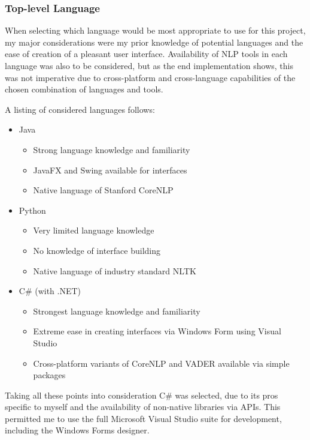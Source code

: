 \documentclass{article}
\begin{document}
{        \subsubsection{Top-level Language}
        \label{subsec:language}
        When selecting which language would be most appropriate to use for this project, my major considerations were my prior knowledge of potential languages and the ease of creation of a pleasant user interface. Availability of NLP tools in each language was also to be considered, but as the end implementation shows, this was not imperative due to cross-platform and cross-language capabilities of the chosen combination of languages and tools.

        A listing of considered languages follows:

        \begin{itemize}
            \item Java
            \begin{itemize}
                \item Strong language knowledge and familiarity
                \item JavaFX and Swing available for interfaces
                \item Native language of Stanford CoreNLP
            \end{itemize}
            \item Python
            \begin{itemize}
                \item Very limited language knowledge
                \item No knowledge of interface building
                \item Native language of industry standard NLTK
            \end{itemize}
            \item C\# (with .NET)
            \begin{itemize}
                \item Strongest language knowledge and familiarity
                \item Extreme ease in creating interfaces via Windows Form using Visual Studio
                \item Cross-platform variants of CoreNLP and VADER available via simple packages
            \end{itemize}
        \end{itemize}
        Taking all these points into consideration C\# was selected, due to its pros specific to myself and the availability of non-native libraries via APIs. This permitted me to use the full Microsoft Visual Studio suite for development, including the Windows Forms designer.
}
\end{document}
